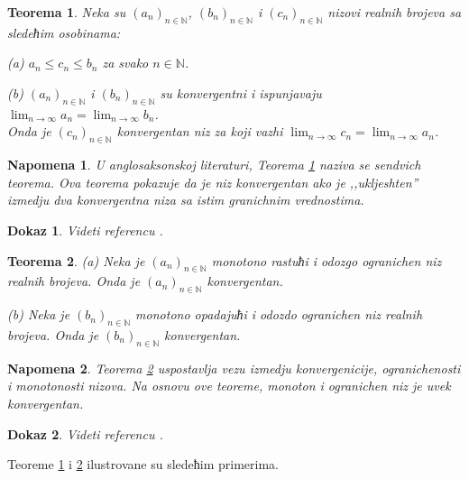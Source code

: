 \documentclass[11pt,a4paper]{article}
\newtheorem{thm}{Teorema}[section]
\newtheorem*{nap}{Napomena}
\newtheorem*{dokaz}{Dokaz}
\begin{document}
\begin{thm}\label{thm4}
Neka su $(a_n)_{n\in\mathbb{N}}$, 
$(b_n)_{n\in\mathbb{N}}$ i 
$(c_n)_{n\in\mathbb{N}}$ nizovi realnih brojeva 
sa sledeћim osobinama: 

(a) $a_n\leq c_n \leq b_n$ za svako $n\in\mathbb{N}$. 

(b) $(a_n)_{n\in\mathbb{N}}$ i $(b_n)_{n\in\mathbb{N}}$
su konvergentni i ispunjavaju 
$\displaystyle\lim_{n\rightarrow\infty} a_n = 
\displaystyle\lim_{n\rightarrow\infty} b_n$. 
\\
Onda je $(c_n)_{n\in\mathbb{N}}$ konvergentan niz za koji vazhi $\displaystyle\lim_{n\rightarrow\infty} c_n =
\displaystyle\lim_{n\rightarrow\infty} a_n$. 
\end{thm}

\begin{nap}
U anglosaksonskoj literaturi, 
Teorema \ref{thm4} naziva se sendvich teorema. 
Ova teorema pokazuje da je niz konvergentan ako je ,,ukljeshten''
izmedju dva konvergentna niza sa istim granichnim vrednostima. 
\end{nap}

\begin{dokaz}
Videti referencu \cite{kadelburg}. 
\end{dokaz}

\begin{thm}\label{thm5}
(a) Neka je $(a_n)_{n\in\mathbb{N}}$ monotono rastuћi i 
odozgo ogranichen niz realnih brojeva. 
Onda je $(a_n)_{n\in\mathbb{N}}$ konvergentan. 

(b) Neka je $(b_n)_{n\in\mathbb{N}}$ monotono opadajuћi i 
odozdo ogranichen niz realnih brojeva. 
Onda je $(b_n)_{n\in\mathbb{N}}$ konvergentan. 
\end{thm}

\begin{nap}
Teorema \ref{thm5} uspostavlja vezu izmedju 
konvergenicije, ogranichenosti i monotonosti nizova. 
Na osnovu ove teoreme, monoton i ogranichen niz je uvek konvergentan. 
\end{nap}

\begin{dokaz}
Videti referencu \cite{kadelburg}. 
\end{dokaz}

Teoreme \ref{thm4} i \ref{thm5} ilustrovane su sledeћim primerima. 
\end{document}
